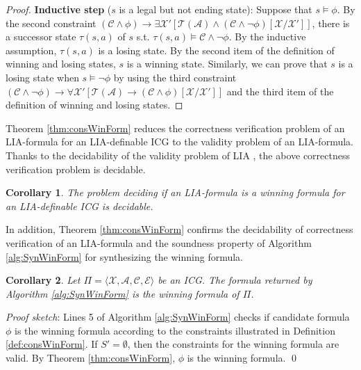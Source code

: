\documentclass[review]{elsarticle}
\newcommand{\set}[1]{\{ #1 \}}
\newcommand{\tuple}[1]{\langle {#1} \rangle}
\newcommand{\statevar}{\mathcal{X}}
\newcommand{\winSet}{\mathcal{W}}
\newcommand{\act}{\mathcal{A}}
\newcommand{\trans}{\mathcal{T}}
\newcommand{\constraint}{\mathcal{C}}
\newcommand{\estate}{\mathcal{E}}
\newenvironment{proofsketch}{\textit{Proof sketch}:}{\qed}
\newtheorem{corollary}{Corollary}
\begin{document}
\begin{proof}
		\textbf{Inductive step} ($s$ is a legal but not ending state):
		Suppose that $s \models \phi$.
		By the second constraint $(\constraint \land \phi) \rightarrow \exists \statevar' [\trans(\act) \land (\constraint \land \neg \phi)[\statevar/\statevar']]$, there is a successor state $\tau(s, a)$ of $s$ s.t. $\tau(s, a) \models \constraint \land \neg \phi$.
		By the inductive assumption, $\tau(s, a)$ is a losing state.
		By the second item of the definition of winning and losing states, $s$ is a winning state.
		Similarly, we can prove that $s$ is a losing state when $s \models \neg \phi$ by using the third constraint $(\constraint \land \neg \phi) \rightarrow \forall \statevar' [\trans(\act) \rightarrow (\constraint \land \phi)[\statevar/\statevar']]$ and the third item of the definition of winning and losing states.
%		
	\end{proof}
	
	Theorem \ref{thm:consWinForm} reduces the correctness verification problem of an LIA-formula for an LIA-definable ICG to the validity problem of an LIA-formula.
	Thanks to the decidability of the validity problem of LIA \cite{Pre1929}, the above correctness verification problem is decidable.
	\begin{corollary}
		The problem deciding if an LIA-formula is a winning formula for an LIA-definable ICG is decidable.
	\end{corollary}
	
	
	In addition, Theorem \ref{thm:consWinForm} confirms the decidability of correctness verification of an LIA-formula and the soundness property of Algorithm \ref{alg:SynWinForm} for synthesizing the winning formula.
	\begin{corollary} \label{cor:winForm}
		Let $\Pi = \tuple{\statevar, \act, \constraint, \estate}$ be an ICG.
		The formula returned by Algorithm \ref{alg:SynWinForm} is the winning formula of $\Pi$.
	\end{corollary}	
	\begin{proofsketch}
		Lines 5 of Algorithm \ref{alg:SynWinForm} checks if candidate formula $\phi$ is the winning formula according to the constraints illustrated in Definition \ref{def:consWinForm}.
		If $S' = \emptyset$, then the constraints for the winning formula are valid.
		By Theorem \ref{thm:consWinForm}, $\phi$ is the winning formula.
	\end{proofsketch}
	
\end{document}
